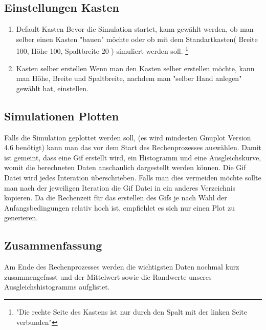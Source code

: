 \documentclass[14pt,a4paper]{scrartcl}
\begin{document}
\subsection{Einstellungen Kasten}
\begin{enumerate}

\item Default Kasten
\newline
Bevor die Simulation startet, kann gewählt werden, ob man selber einen Kasten "bauen" möchte oder ob mit dem Standartkasten( Breite 100, Höhe 100, Spaltbreite 20 ) simuliert werden soll.
\footnote{"Die rechte Seite des Kastens ist nur durch den Spalt mit der linken Seite verbunden"}
\item Kasten selber erstellen
\newline
Wenn man den Kasten selber erstellen möchte, kann man Höhe, Breite und Spaltbreite, nachdem man "selber Hand anlegen" gewählt hat, einstellen.

\end{enumerate}

\subsection{Simulationen Plotten}
Falls die Simulation geplottet werden soll, (es wird mindesten Gnuplot Version 4.6 benötigt)
kann man das vor dem Start des Rechenprozesses auswählen.
Damit ist gemeint, dass eine Gif erstellt wird, ein Histogramm und eine Ausgleichskurve, womit die berechneten Daten anschaulich dargestellt werden können.
Die Gif Datei wird jedes Interation überschrieben.
Falls man dies vermeiden möchte sollte man nach der jeweiligen Iteration die Gif Datei in ein anderes Verzeichnis kopieren.
Da die Rechenzeit für das erstellen des Gifs je nach Wahl der Anfangsbedingungen relativ hoch ist, empfiehlet es sich nur einen Plot zu generieren.

\subsection{Zusammenfassung}
Am Ende des Rechenprozesses werden die wichtigsten Daten nochmal kurz zusammengefasst und der Mittelwert sowie die Randwerte unseres Ausgleichshistogramms aufglistet.
\end{document}
